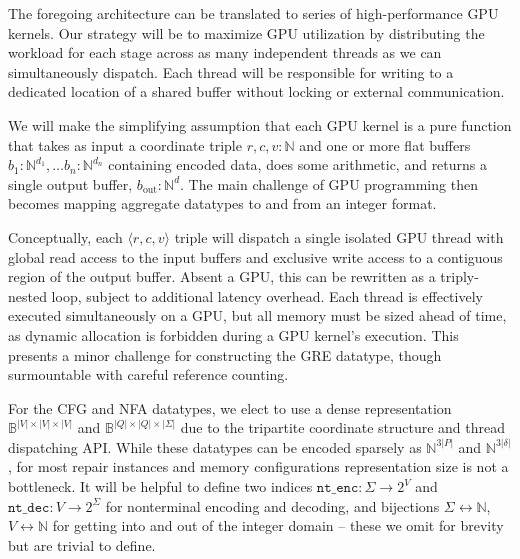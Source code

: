 \documentclass[sigplan,review,acmsmall,nonacm,screen,anonymous]{acmart}\settopmatter{printfolios=false,printccs=false,printacmref=false}
\begin{document}
The foregoing architecture can be translated to series of high-performance GPU kernels. Our strategy will be to maximize GPU utilization by distributing the workload for each stage across as many independent threads as we can simultaneously dispatch. Each thread will be responsible for writing to a dedicated location of a shared buffer without locking or external communication.

We will make the simplifying assumption that each GPU kernel is a pure function that takes as input a coordinate triple $r, c, v: \mathbb{N}$ and one or more flat buffers $b_1: \mathbb{N}^{d_1}, \ldots b_n: \mathbb{N}^{d_n}$ containing encoded data, does some arithmetic, and returns a single output buffer, $b_{\text{out}}: \mathbb{N}^{d}$. The main challenge of GPU programming then becomes mapping aggregate datatypes to and from an integer format.

Conceptually, each $\langle r, c, v\rangle$ triple will dispatch a single isolated GPU thread with global read access to the input buffers and exclusive write access to a contiguous region of the output buffer. Absent a GPU, this can be rewritten as a triply-nested loop, subject to additional latency overhead. Each thread is effectively executed simultaneously on a GPU, but all memory must be sized ahead of time, as dynamic allocation is forbidden during a GPU kernel's execution. This presents a minor challenge for constructing the GRE datatype, though surmountable with careful reference counting.

For the CFG and NFA datatypes, we elect to use a dense representation $\mathbb{B}^{|V|\times|V|\times|V|}$ and $\mathbb{B}^{|Q|\times|Q|\times |\Sigma|}$ due to the tripartite coordinate structure and thread dispatching API. While these datatypes can be encoded sparsely as $\mathbb{N}^{3|P|}$ and $\mathbb{N}^{3|\delta|}$, for most repair instances and memory configurations representation size is not a bottleneck. It will be helpful to define two indices $\texttt{nt\_enc}: \Sigma \rightarrow 2^V$ and $\texttt{nt\_dec}: V \rightarrow 2^\Sigma$ for nonterminal encoding and decoding, and bijections $\Sigma \leftrightarrow \mathbb{N}$, $V \leftrightarrow \mathbb{N}$ for getting into and out of the integer domain -- these we omit for brevity but are trivial to define.
\end{document}
